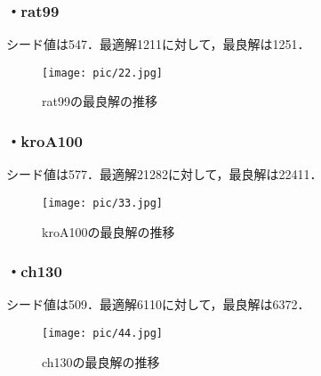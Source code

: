 \documentclass[a4j]{jarticle}
\begin{document}
\subsubsection*{・rat99}
シード値は547．最適解1211に対して，最良解は1251．
\begin{figure}[H]
 \begin{center}
  \texttt{[image: pic/22.jpg]}
  \caption{rat99の最良解の推移}
  \label{22}
 \end{center}
\end{figure}
\clearpage
\subsubsection*{・kroA100}
シード値は577．最適解21282に対して，最良解は22411．
\begin{figure}[H]
 \begin{center}
  \texttt{[image: pic/33.jpg]}
  \caption{kroA100の最良解の推移}
  \label{33}
 \end{center}
\end{figure}
\subsubsection*{・ch130}
シード値は509．最適解6110に対して，最良解は6372．
\begin{figure}[H]
 \begin{center}
  \texttt{[image: pic/44.jpg]}
  \caption{ch130の最良解の推移}
  \label{44}
 \end{center}
\end{figure}
\end{document}
